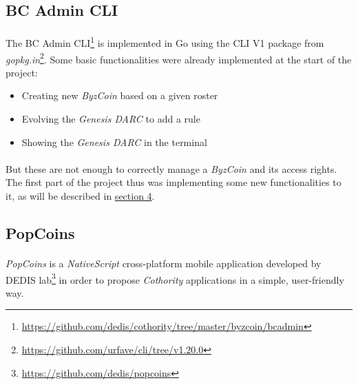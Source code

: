 \subsection{BC Admin CLI}

\paragraph{}

The BC Admin CLI\footnote{\url{https://github.com/dedis/cothority/tree/master/byzcoin/bcadmin}} is implemented in Go using the CLI V1 package from \textit{gopkg.in}\footnote{\url{https://github.com/urfave/cli/tree/v1.20.0}}. Some basic functionalities were already implemented at the start of the project:
\begin{itemize}
    \item Creating new \textit{ByzCoin} based on a given roster
    \item Evolving the \textit{Genesis DARC} to add a rule
    \item Showing the \textit{Genesis DARC} in the terminal
\end{itemize}

\paragraph{}
But these are not enough to correctly manage a \textit{ByzCoin} and its access rights. The first part of the project thus was implementing some new functionalities to it, as will be described in \hyperref[section4]{section 4}.

\subsection{PopCoins}

\paragraph{}

\textit{PopCoins} is a \textit{NativeScript} cross-platform mobile application developed by DEDIS lab\footnote{\url{https://github.com/dedis/popcoins}} in order to propose \textit{Cothority} applications in a simple, user-friendly way.

